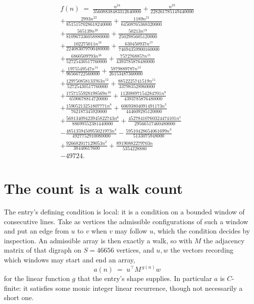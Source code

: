 \documentclass[11pt,a4paper]{article}
\theoremstyle{plain}
\theoremstyle{definition}
\begin{document}
\begin{multline*}
f(n)\;=\;\frac{n^{24}}{35608838483312640000} + \frac{n^{23}}{228261785149440000} \\
+ \frac{2993 n^{22}}{8515157028618240000} + \frac{1189 n^{21}}{64508765368320000} \\
+ \frac{565139 n^{20}}{810967336058880000} + \frac{50213 n^{19}}{2502985605120000} \\
+ \frac{102275011 n^{18}}{224083079700480000} + \frac{630450937 n^{17}}{74694359900160000} \\
+ \frac{6860509793 n^{16}}{52725430517760000} + \frac{7572768857 n^{15}}{4393785876480000} \\
+ \frac{1975549547 n^{14}}{96566722560000} + \frac{5979889787 n^{13}}{26153487360000} \\
+ \frac{129750858133763 n^{12}}{52725430517760000} + \frac{8852225741519 n^{11}}{337983528960000} \\
+ \frac{1757155928198569 n^{10}}{6590678814720000} + \frac{11208897154284701 n^{9}}{4393785876480000} \\
+ \frac{15905213251807771 n^{8}}{762187345920000} + \frac{60693804091491173 n^{7}}{444609285120000} \\
+ \frac{56813409423945822743 n^{6}}{88699552381440000} + \frac{45278410760324474101 n^{5}}{29566517460480000} \\
- \frac{4851359450955021973 n^{4}}{4927752910080000} - \frac{59510428654061699 n^{3}}{5133075948000} \\
+ \frac{926682017129053 n^{2}}{38440617600} + \frac{89190882279703 n}{5354228880} \\
- 49724.
\end{multline*}

\section{The count is a walk count}

The entry's defining condition is local: it is a condition on a bounded window of consecutive lines. Take as vertices the
admissible configurations of such a window and put an edge from $u$ to $v$ when $v$ may
follow $u$, which the condition decides by inspection. An admissible array is then exactly a
walk, so with $M$ the adjacency matrix of that digraph on $S=46656$ vertices, and $u,w$ the
vectors recording which windows may start and end an array,
\[
a(n)\;=\;u^{\!\top}M^{\,g(n)}w
\]
for the linear function $g$ that the entry's shape supplies. In particular $a$ is
$C$-finite: it satisfies some monic integer linear recurrence, though not necessarily a short
one.
\end{document}
